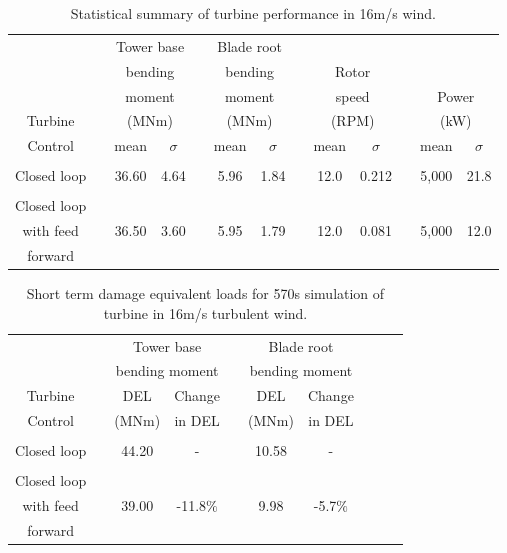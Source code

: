 \begin{table}
\caption{Statistical summary of turbine performance in 16m/s wind.}
\centering
\begin{tabular}{ c | c c c c c c c c c c c c}
\hline
\hline
	& & \multicolumn{2}{c}{Tower base}	& & \multicolumn{2}{c}{Blade root}		& & \\
	& & \multicolumn{2}{c}{bending}	& & \multicolumn{2}{c}{bending}		& &\multicolumn{2}{c}{Rotor}	& & \\
	& & \multicolumn{2}{c}{moment}	& & \multicolumn{2}{c}{moment}		& &\multicolumn{2}{c}{speed}		& &\multicolumn{2}{c}{Power} \\	
Turbine					& & \multicolumn{2}{c}{(MNm)}  					& & \multicolumn{2}{c}{(MNm)}	& & \multicolumn{2}{c}{(RPM)}	& & \multicolumn{2}{c}{(kW)}\\
\cline{3-4} \cline{6-7} \cline{9-10} \cline{12-13} 
Control & & mean & $\sigma$ & & mean & $\sigma$ & & mean & $\sigma$  & & mean & $\sigma$ \\
\hline
\\
Closed loop  & & 36.60 & 4.64  & & 5.96 & 1.84  && 12.0 & 0.212&& 5,000  & 21.8 \\
 \\
Closed loop\\
with feed  & & 36.50 & 3.60  & & 5.95 & 1.79 && 12.0 & 0.081  && 5,000  & 12.0 \\
forward\\
\hline
\hline
\end{tabular}
\label{Table3-5}
\end{table}

\begin{table}
\caption{Short term damage equivalent loads for 570s simulation of turbine  in 16m/s turbulent wind.}
\centering
\begin{tabular}{ c | c c c c c c c c c}
\hline
\hline
					&&\multicolumn{2}{c}{Tower base}					&&\multicolumn{2}{c}{Blade	root} \\
					&&\multicolumn{2}{c}{bending moment}			&&\multicolumn{2}{c}{bending moment}\\
						\cline{3-4} 														\cline{6-7}
Turbine			&& DEL   	& Change										&& DEL  	& Change\\
Control			&& (MNm)  & in DEL 										&& (MNm)  & in DEL 	\\
\hline
\\
Closed loop  && 44.20 & - 													&& 10.58 & - \\
 \\
Closed loop\\
with feed  		&& 39.00 & -11.8$\%$ 									&& 9.98 & -5.7$\%$\\
forward\\
\hline
\hline
\end{tabular}
\label{Table3-6}
\end{table}

